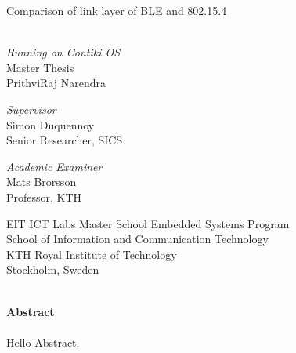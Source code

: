 \begin{titlepage}
\thispagestyle{empty}
\begin{center}

  \vspace{.5cm}
  \huge{Comparison of link layer of BLE and 802.15.4}\tiny{}\\
  \vspace{0.3cm}
  \\
  \vspace{0.2cm}
  \LARGE{\textit{Running on Contiki OS}}\\
  \vspace{2cm}
  \Large{Master Thesis}\\
  

  \vspace{2cm}		
  \LARGE{PrithviRaj Narendra}
  \vspace{3.5cm} 
  
  \large{\textit{Supervisor}}\\
  \LARGE{Simon Duquennoy}\\
  \vspace{0.2cm}
  \Large{Senior Researcher, SICS}\\
  \vspace{2cm}
  
  \large{\textit{Academic Examiner}}\\
  \LARGE{Mats Brorsson}\\
  \vspace{0.2cm}
  \Large{Professor, KTH}\\
  \vspace{2cm}

\large
EIT ICT Labs Master School Embedded Systems Program\\
School of Information and Communication Technology\\
KTH Royal Institute of Technology\\
Stockholm, Sweden\\
\vspace{1cm}
\\
\end{center} 

\end{titlepage}

\newpage\null\thispagestyle{empty}\newpage

\thispagestyle{plain}
{}
\huge{\textbf{Abstract}} \\
\normalsize \\
Hello Abstract. 
\clearpage

